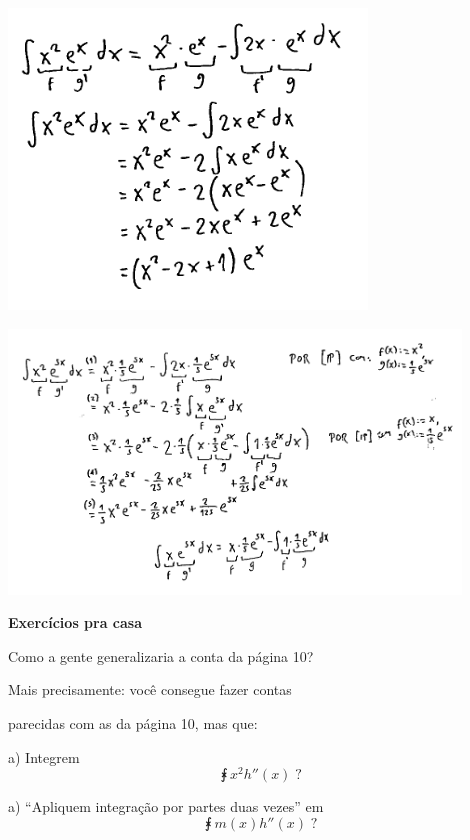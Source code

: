 \documentclass[oneside,12pt]{article}
\begin{document}
\includegraphics[height=8cm]{2022-2-C2/int_partes_2.pdf}

\includegraphics[width=12cm]{2022-2-C2/int_partes_3.pdf}


\newpage


{\bf Exercícios pra casa}

Como a gente generalizaria a conta da página 10?

Mais precisamente: você consegue fazer contas

parecidas com as da página 10, mas que:

\msk

a) Integrem
%
$$\intx{x^2 h''(x)}\;?$$

\ssk

a) ``Apliquem integração por partes duas vezes'' em
%
$$\intx{m(x) h''(x)}\;?$$

% 
% 
% 
\end{document}
